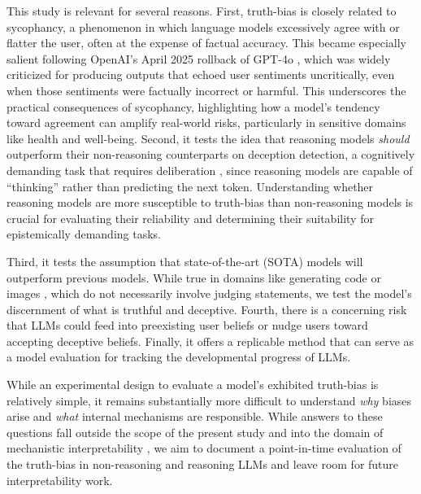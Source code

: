 \documentclass{article}
\begin{document}
This study is relevant for several reasons. First, truth-bias is closely related to sycophancy, a phenomenon in which language models excessively agree with or flatter the user, often at the expense of factual accuracy. This became especially salient following OpenAI's April 2025 rollback of GPT-4o \citep{openai_sycophancy_4o_2025}, which was widely criticized for producing outputs that echoed user sentiments uncritically, even when those sentiments were factually incorrect or harmful. This underscores the practical consequences of sycophancy, highlighting how a model's tendency toward agreement can amplify real-world risks, particularly in sensitive domains like health and well-being. Second, it tests the idea that reasoning models \textit{should} outperform their non-reasoning counterparts on deception detection, a cognitively demanding task that requires deliberation \citep{mccornack_deception_1986}, since reasoning models are capable of ``thinking'' rather than predicting the next token. Understanding whether reasoning models are more susceptible to truth-bias than non-reasoning models is crucial for evaluating their reliability and determining their suitability for epistemically demanding tasks.

Third, it tests the assumption that state-of-the-art (SOTA) models will outperform previous models. While true in domains like generating code or images \citep{handa2025economictasksperformedai, anthropic_anthropic_2025}, which do not necessarily involve judging statements, we test the model's discernment of what is truthful and deceptive. Fourth, there is a concerning risk that LLMs could feed into preexisting user beliefs or nudge users toward accepting deceptive beliefs. Finally, it offers a replicable method that can serve as a model evaluation for tracking the developmental progress of LLMs.

While an experimental design to evaluate a model's exhibited truth-bias is relatively simple, it remains substantially more difficult to understand \textit{why} biases arise and \textit{what} internal mechanisms are responsible. While answers to these questions fall outside the scope of the present study and into the domain of mechanistic interpretability \citep{Nanda2023ProgressMF}, we aim to document a point-in-time evaluation of the truth-bias in non-reasoning and reasoning LLMs and leave room for future interpretability work.
\end{document}
